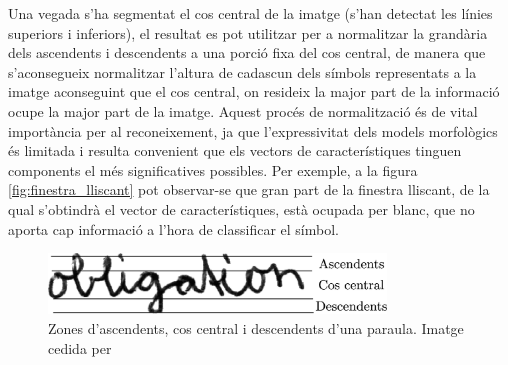 Una vegada s'ha segmentat el cos central de la imatge (s'han detectat les línies superiors i inferiors), el resultat es pot utilitzar per a normalitzar la grandària dels ascendents i descendents a una porció fixa del cos central, de manera que s'aconsegueix normalitzar l'altura de cadascun dels símbols representats a la imatge aconseguint que el cos central, on resideix la major part de la informació ocupe la major part de la imatge. Aquest procés de normalització és de vital importància per al reconeixement, ja que l'expressivitat dels models morfològics és limitada i resulta convenient que els vectors de característiques tinguen components el més significatives possibles. Per exemple, a la figura \ref{fig:finestra_lliscant} pot observar-se que gran part de la finestra lliscant, de la qual s'obtindrà el vector de característiques, està ocupada per blanc, que no aporta cap informació a l'hora de classificar el símbol.\\

\begin{figure}
\centering
\includegraphics[width=0.8\textwidth]{images/ascendents_descendents_central.eps}
\caption{Zones d'ascendents, cos central i descendents d'una paraula. Imatge cedida per \cite{Pastor07}}\label{fig:ascendents_descendents_central}
\end{figure}

